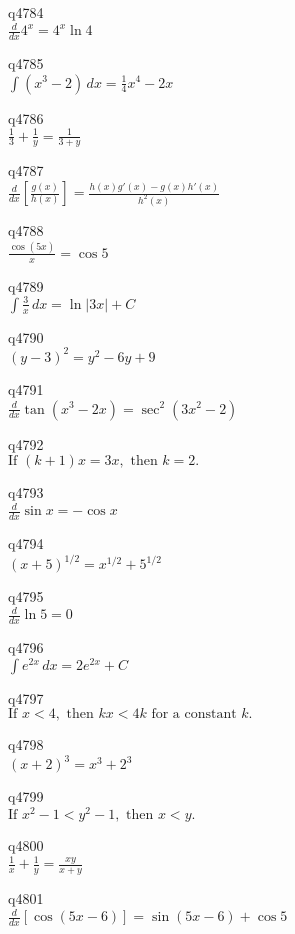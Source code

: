 q4784\\
\(\displaystyle \frac{d}{dx} 4^x = 4^x \ln 4 \)

q4785\\
\(\displaystyle \int (x^3 - 2)\,dx = \frac{1}{4}x^4 - 2x \)

q4786\\
\(\displaystyle \frac{1}{3} + \frac{1}{y} = \frac{1}{3+y} \)

q4787\\
\(\displaystyle \frac{d}{dx} \left [ \frac{g(x)}{h(x)} \right ] = \frac{h(x)g'(x) - g(x)h'(x)}{h^2(x)} \)

q4788\\
\(\displaystyle \frac{\cos(5x)}{x} = \cos 5 \)

q4789\\
\(\displaystyle \int \frac{3}{x}\,dx = \ln |3x| + C \)

q4790\\
\(\displaystyle (y-3)^2 = y^2 - 6y + 9 \)

q4791\\
\(\displaystyle \frac{d}{dx} \tan(x^3 - 2x) = \sec^2(3x^2-2) \)

q4792\\
\(\displaystyle \text{If } (k+1)x = 3x, \text{ then } k = 2. \)

q4793\\
\(\displaystyle \frac{d}{dx} \sin x = -\cos x \)

q4794\\
\(\displaystyle (x+5)^{1/2} = x^{1/2} + 5^{1/2} \)

q4795\\
\(\displaystyle \frac{d}{dx} \ln 5 = 0 \)

q4796\\
\(\displaystyle \int e^{2x}\,dx = 2e^{2x} + C \)

q4797\\
\(\displaystyle \text{If } x < 4, \text{ then } kx < 4k \text{ for a constant } k. \)

q4798\\
\(\displaystyle (x+2)^3 = x^3 + 2^3 \)

q4799\\
\(\displaystyle \text{If } x^2 - 1 < y^2 - 1, \text{ then } x < y. \)

q4800\\
\(\displaystyle \frac{1}{x} + \frac{1}{y} = \frac{xy}{x+y} \)

q4801\\
\(\displaystyle \frac{d}{dx} [ \cos(5x - 6) ] = \sin(5x - 6) + \cos 5 \)

